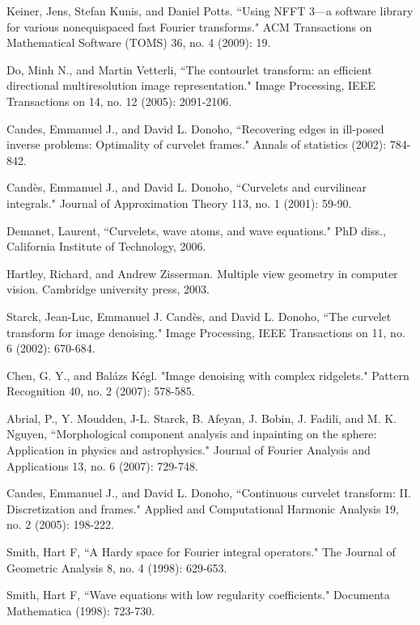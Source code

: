 \documentclass{UCF_ETD}
\begin{document}
\begin{thebibliography}{99}
Keiner, Jens, Stefan Kunis, and Daniel Potts. ``Using NFFT 3---a software library for various nonequispaced fast Fourier transforms." ACM Transactions on Mathematical Software (TOMS) 36, no. 4 (2009): 19.

Do, Minh N., and Martin Vetterli, ``The contourlet transform: an efficient directional multiresolution image representation." Image Processing, IEEE Transactions on 14, no. 12 (2005): 2091-2106.

Candes, Emmanuel J., and David L. Donoho, ``Recovering edges in ill-posed inverse problems: Optimality of curvelet frames." Annals of statistics (2002): 784-842.

Candès, Emmanuel J., and David L. Donoho, ``Curvelets and curvilinear integrals." Journal of Approximation Theory 113, no. 1 (2001): 59-90.

Demanet, Laurent, ``Curvelets, wave atoms, and wave equations." PhD diss., California Institute of Technology, 2006.

Hartley, Richard, and Andrew Zisserman. Multiple view geometry in computer vision. Cambridge university press, 2003.

Starck, Jean-Luc, Emmanuel J. Candès, and David L. Donoho, ``The curvelet transform for image denoising." Image Processing, IEEE Transactions on 11, no. 6 (2002): 670-684.

Chen, G. Y., and Balázs Kégl. "Image denoising with complex ridgelets." Pattern Recognition 40, no. 2 (2007): 578-585.

Abrial, P., Y. Moudden, J-L. Starck, B. Afeyan, J. Bobin, J. Fadili, and M. K. Nguyen, ``Morphological component analysis and inpainting on the sphere: Application in physics and astrophysics." Journal of Fourier Analysis and Applications 13, no. 6 (2007): 729-748.

Candes, Emmanuel J., and David L. Donoho, ``Continuous curvelet transform: II. Discretization and frames." Applied and Computational Harmonic Analysis 19, no. 2 (2005): 198-222.

Smith, Hart F, ``A Hardy space for Fourier integral operators." The Journal of Geometric Analysis 8, no. 4 (1998): 629-653.

Smith, Hart F, ``Wave equations with low regularity coefficients." Documenta Mathematica (1998): 723-730.


\end{thebibliography}
\end{document}
